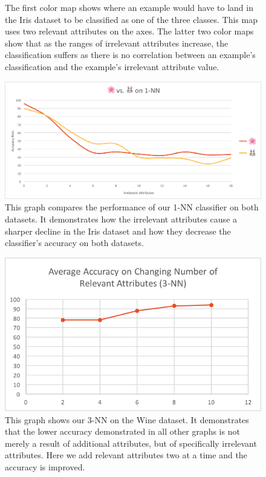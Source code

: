 \documentclass{article}
\begin{document}
\begin{figure}[hbt]
\caption{The first color map shows where an example would have to land in the Iris dataset to be classified as one of the three classes. This map uses two relevant attributes on the axes. The latter two color maps show that as the ranges of irrelevant attributes increase, the classification suffers as there is no correlation between an example's classification and the example's irrelevant attribute value.}
\end{figure}

\begin{figure}[hbt]
\centering
\includegraphics[scale=0.6]{iris-vs-animals} 
\caption{This graph compares the performance of our 1-NN classifier on both datasets. It demonstrates how the irrelevant attributes cause a sharper decline in the Iris dataset and how they decrease the classifier’s accuracy on both datasets.}
\end{figure}

\begin{figure}[hbt]
\centering
\includegraphics[scale=1]{wine-accuracy} 
\caption{This graph shows our 3-NN on the Wine dataset. It demonstrates that the lower accuracy demonstrated in all other graphs is not merely a result of additional attributes, but of specifically irrelevant attributes. Here we add relevant attributes two at a time and the accuracy is improved.}
\end{figure}
\end{document}
